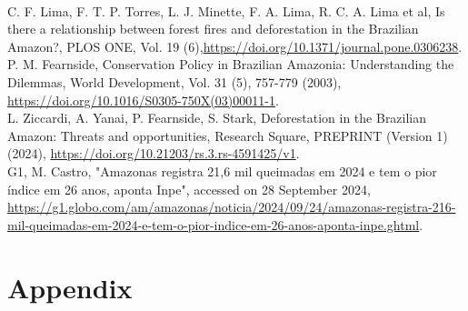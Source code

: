\documentclass[a4paper,fleqn]{cas-dc}
\begin{document}
\begin{thebibliography}{00}
\\
 C. F. Lima, F. T. P. Torres, L. J. Minette, F. A. Lima, R. C. A. Lima et al, Is there a relationship between forest fires and deforestation in the Brazilian Amazon?, PLOS ONE, Vol. 19 (6),\href{https://doi.org/10.1371/journal.pone.0306238}{https://doi.org/10.1371/journal.pone.0306238}.
\\
 P. M. Fearnside, Conservation Policy in Brazilian Amazonia: Understanding the Dilemmas, World Development, Vol. 31 (5), 757-779 (2003), \href{https://doi.org/10.1016/S0305-750X(03)00011-1}{https://doi.org/10.1016/S0305-750X(03)00011-1}.
\\
 L. Ziccardi, A. Yanai, P. Fearnside, S. Stark, Deforestation in the Brazilian Amazon: Threats and opportunities, Research Square, PREPRINT (Version 1) (2024), \href{https://doi.org/10.21203/rs.3.rs-4591425/v1}{https://doi.org/10.21203/rs.3.rs-4591425/v1}.
\\
 G1, M. Castro, "Amazonas registra 21,6 mil queimadas em 2024 e tem o pior índice em 26 anos, aponta Inpe", accessed on 28 September 2024, \href{https://g1.globo.com/am/amazonas/noticia/2024/09/24/amazonas-registra-216-mil-queimadas-em-2024-e-tem-o-pior-indice-em-26-anos-aponta-inpe.ghtml}{https://g1.globo.com/am/amazonas/noticia/2024/09/24/amazonas-registra-216-mil-queimadas-em-2024-e-tem-o-pior-indice-em-26-anos-aponta-inpe.ghtml}.
\\

\end{thebibliography}

\clearpage

\appendix
\renewcommand{\thetable}{A.\arabic{table}}
\setcounter{table}{0}  %

\section{Appendix}
\end{document}
